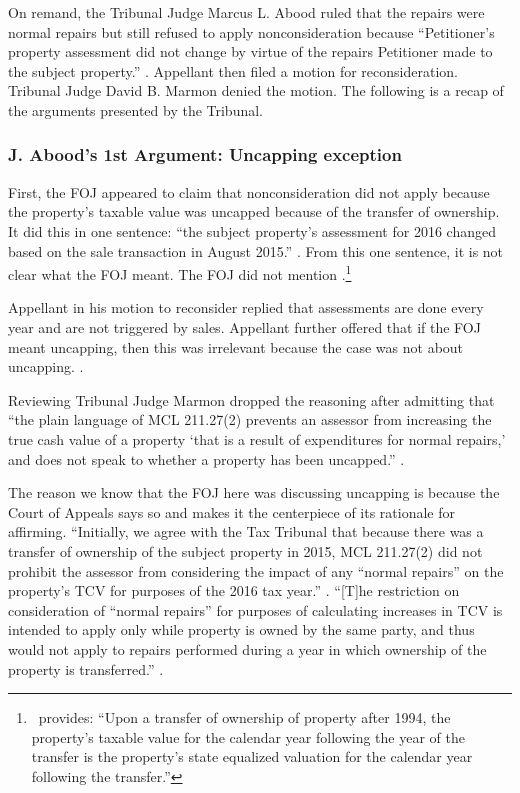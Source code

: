 \documentclass[12pt,\documentclassflag]{michiganCourtOfAppealsBrief}
\begin{document}
On remand, the Tribunal Judge Marcus L. Abood ruled that the repairs were normal repairs but still refused to apply nonconsideration because ``Petitioner's property assessment did not change by virtue of the repairs Petitioner made to the subject property.'' .
Appellant then filed a motion for reconsideration. Tribunal Judge David B. Marmon denied the motion.
The following is a recap of the arguments presented by the Tribunal.

\subsubsection{J. Abood's 1st Argument: Uncapping exception}

First, the FOJ appeared to claim that nonconsideration did not apply because the property's taxable value was uncapped because of the transfer of ownership.
It did this in one sentence:
``the subject property's assessment for 2016 changed based on the sale transaction in August 2015.''
.
From this one sentence, it is not clear what the FOJ meant. The FOJ did not mention \cite{MCL 211.27a(3)}.\footnote{\cite[s]{MCL 211.27a(3)}\ provides: ``Upon a transfer of ownership of property after 1994, the property's taxable value for the calendar year following the year of the transfer is the property's state equalized valuation for the calendar year following the transfer.''}

Appellant in his motion to reconsider replied that assessments are done every year and are not triggered by sales. Appellant further offered that if the FOJ meant uncapping, then this was irrelevant because the case was not about uncapping.
.

Reviewing Tribunal Judge Marmon dropped the reasoning after admitting that
``the plain language of MCL 211.27(2) prevents an assessor from increasing the true cash value of a property `that is a result of expenditures for normal repairs,' and does not speak to whether a property has been uncapped.''
.

The reason we know that the FOJ here was discussing uncapping is because the Court of Appeals says so and  makes it the centerpiece of its rationale for affirming. ``Initially, we agree with the Tax Tribunal that because there was a transfer of ownership of the
subject property in 2015, MCL 211.27(2) did not prohibit the assessor from considering the impact
of any ``normal repairs'' on the property's TCV for purposes of the 2016 tax year.'' . ``[T]he restriction on consideration of ``normal repairs'' for purposes of calculating
increases in TCV is intended to apply only while property is owned by the same party, and thus
would not apply to repairs performed during a year in which ownership of the property is
transferred.'' .
\end{document}
